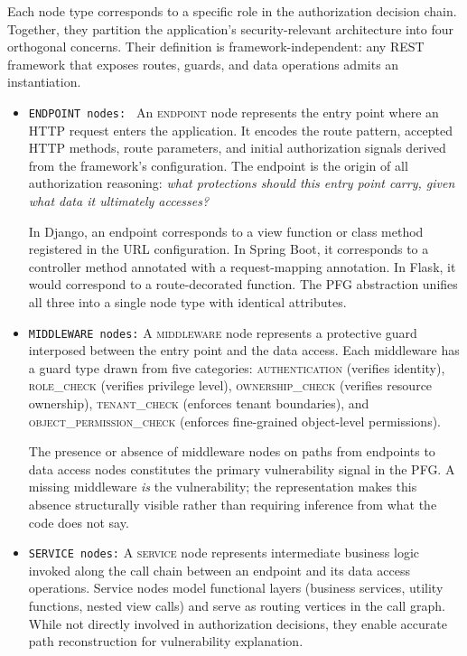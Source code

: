 Each node type corresponds to a specific role in the authorization decision
chain. Together, they partition the application's security-relevant
architecture into four orthogonal concerns. Their definition is
framework-independent: any REST framework that exposes routes, guards, and
data operations admits an instantiation.


\begin{itemize}

\item \texttt{ENDPOINT nodes: } An \textsc{endpoint} node represents the entry point where an HTTP request
enters the application. It encodes the route pattern, accepted HTTP methods,
route parameters, and initial authorization signals derived from the
framework's configuration. The endpoint is the origin of all authorization
reasoning: \emph{what protections should this entry point carry, given what
data it ultimately accesses?}

In Django, an endpoint corresponds to a view function or class method
registered in the URL configuration. In Spring Boot, it corresponds to a
controller method annotated with a request-mapping annotation. In Flask, it
would correspond to a route-decorated function. The PFG abstraction unifies
all three into a single node type with identical attributes.


\item \texttt{MIDDLEWARE nodes:} A \textsc{middleware} node represents a protective guard interposed between
the entry point and the data access. Each middleware has a guard type drawn
from five categories: \textsc{authentication} (verifies identity),
\textsc{role\_check} (verifies privilege level),
\textsc{ownership\_check} (verifies resource ownership),
\textsc{tenant\_check} (enforces tenant boundaries), and
\textsc{object\_permission\_check} (enforces fine-grained object-level
permissions).

The presence or absence of middleware nodes on paths from endpoints to data
access nodes constitutes the primary vulnerability signal in the PFG. A
missing middleware \emph{is} the vulnerability; the representation makes
this absence structurally visible rather than requiring inference from what
the code does not say.

\item \texttt{SERVICE nodes:} A \textsc{service} node represents intermediate business logic invoked along
the call chain between an endpoint and its data access operations. Service
nodes model functional layers (business services, utility functions, nested
view calls) and serve as routing vertices in the call graph. While not
directly involved in authorization decisions, they enable accurate path
reconstruction for vulnerability explanation.


\end{itemize}
